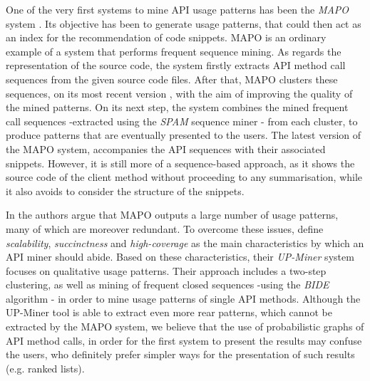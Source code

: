 One of the very first systems to mine API usage patterns has been the \textit{MAPO} system \citep{Xie:2006}. Its objective has been to generate usage patterns, that could then act as an index for the recommendation of code snippets. MAPO is an ordinary example of a system that performs frequent sequence mining. As regards the representation of the source code, the system firstly extracts API method call sequences from the given source code files. After that, MAPO clusters these sequences, on its most recent version \citep{Zhong:2009}, with the aim of improving the quality of the mined patterns. On its next step, the system combines the mined frequent call sequences -extracted using the \textit{SPAM} sequence miner \citep{Ayres:2002}- from each cluster, to produce patterns that are eventually presented to the users. The latest version of the MAPO system, accompanies the API sequences with their associated snippets. However, it is still more of a sequence-based approach, as it shows the source code of the client method without proceeding to any summarisation, while it also avoids to consider the structure of the snippets.

In \citep{Wang:2013} the authors argue that MAPO outputs a large number of usage patterns, many of which are moreover redundant. To overcome these issues,  define \textit{scalability}, \textit{succinctness} and \textit{high-coverage} as the main characteristics by which an API miner should abide. Based on these characteristics, their \textit{UP-Miner} system focuses on qualitative usage patterns. Their approach includes a two-step clustering, as well as mining of frequent closed sequences -using the \textit{BIDE} algorithm \citep{Wang:2004}- in order to mine usage patterns of single API methods. Although the UP-Miner tool is able to extract even more rear patterns, which cannot be extracted by the MAPO system, we believe that the use of probabilistic graphs of API method calls, in order for the first system to present the results may confuse the users, who definitely prefer simpler ways for the presentation of such results (e.g. ranked lists).

